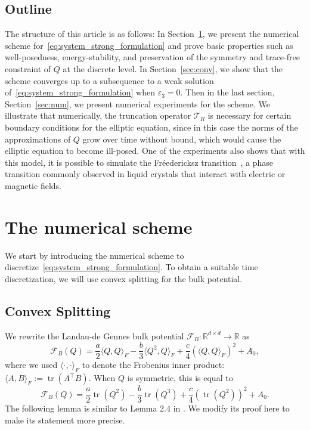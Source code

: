 \documentclass[10pt,letterpaper]{amsart}
\newcommand{\R}{\mathbb{R}}
\DeclareMathOperator{\tr}{\text{tr}}
\newcommand{\T}{\mathcal T}
\theoremstyle{definition}{\newtheorem{definition}[lemma]{Definition}}
\theoremstyle{note}{\newtheorem{claim}{Claim}[section]
\newtheorem*{claim*}{Claim}}
\numberwithin{equation}{section}
\begin{document}
\subsection{Outline} The structure of this article is as follows: In Section~\ref{sec:numscheme}, we present the numerical scheme for~\eqref{eq:system_strong_formulation} and prove basic properties such as well-posedness, energy-stability, and preservation of the symmetry and trace-free constraint of $Q$ at the discrete level. In Section~\ref{sec:conv}, we show that the scheme converges up to a subsequence to a weak solution of~\eqref{eq:system_strong_formulation} when $\varepsilon_3 = 0$. Then in the last section, Section~\ref{sec:num}, we present numerical experiments for the scheme. We illustrate that numerically, the truncation operator $\T_R$ is necessary for certain boundary conditions for the elliptic equation, since in this case the norms of the approximations of $Q$ grow over time without bound, which would cause the elliptic equation to become ill-posed. One of the experiments also shows that with this model, it is possible to simulate the Fr\'{e}edericksz transition~\cite{Freedericksz1927}, a phase transition commonly observed in liquid crystals that interact with electric or magnetic fields.



\section{The numerical scheme}\label{sec:numscheme}
We start by introducing the numerical scheme to discretize~\eqref{eq:system_strong_formulation}. To obtain a suitable time discretization, we will use convex splitting for the bulk potential. 

\subsection{Convex Splitting}
We rewrite the Landau-de Gennes bulk potential $\mathcal{F}_B:\R^{d\times d}\to \R$ as
\[
    \mathcal{F}_B(Q) = \frac{a}{2}\langle Q, Q\rangle_F - \frac{b}{3}\langle Q^2, Q\rangle_F + \frac{c}{4}(\langle Q, Q\rangle_F)^2 + A_0,
\]
where we used $\langle\cdot, \cdot\rangle_F$ to denote the Frobenius inner product: $\langle A,B\rangle_F:= \tr(A^\top B)$.
When $Q$ is symmetric, this is equal to
\[
    \mathcal{F}_B(Q) = \frac{a}{2}\tr(Q^2) - \frac{b}{3}\tr(Q^3) + \frac{c}{4}(\tr(Q^2))^2 + A_0.
\]
The following lemma is similar to Lemma 2.4 in \cite{Zhao2016}. We modify its proof here to make its statement more precise.
\end{document}
